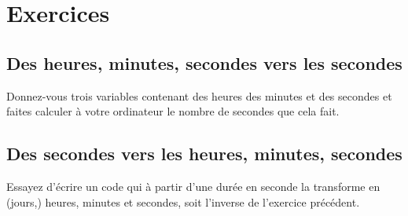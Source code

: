 \section*{Exercices}
{}
\subsection*{Des heures, minutes, secondes vers les secondes}
Donnez-vous trois variables contenant des heures des minutes et des secondes
et faites calculer à votre ordinateur le nombre de secondes que cela fait.


\subsection*{Des secondes vers les heures, minutes, secondes}
Essayez d'écrire un code qui à partir d'une durée en seconde la transforme en (jours,) heures, minutes et secondes, soit l'inverse de l'exercice précédent.

